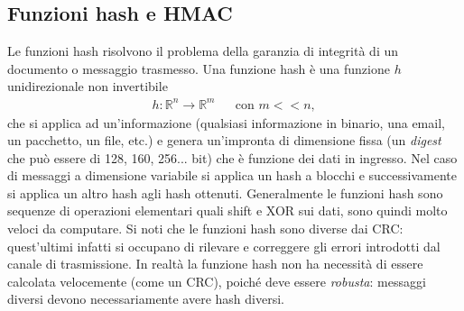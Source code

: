 \subsection{Funzioni hash e HMAC}
Le funzioni hash risolvono il problema della garanzia di integrità di un documento o messaggio trasmesso. Una funzione hash è una funzione $h$ unidirezionale non invertibile
\begin{eqnarray*}
h:\mathbb{R}^n\to\mathbb{R}^m & & \text{con } m << n\text{,}\
\end{eqnarray*}
che si applica ad un'informazione (qualsiasi informazione in binario, una email, un pacchetto, un file, etc.) e genera un'impronta di dimensione fissa (un \textit{digest} che può essere di 128, 160, 256... bit) che è funzione dei dati in ingresso. Nel caso di messaggi a dimensione variabile si applica un hash a blocchi e successivamente si applica un altro hash agli hash ottenuti. Generalmente le funzioni hash sono sequenze di operazioni elementari quali shift e XOR sui dati, sono quindi molto veloci da computare. Si noti che le funzioni hash sono diverse dai CRC: quest'ultimi infatti si occupano di rilevare e correggere gli errori introdotti dal canale di trasmissione. In realtà la funzione hash non ha necessità di essere calcolata velocemente (come un CRC), poiché deve essere \textit{robusta}: messaggi diversi devono necessariamente avere hash diversi.

